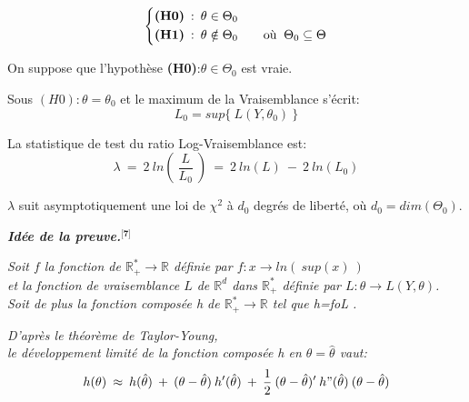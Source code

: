 \documentclass[11pt,fleqn]{book} %
\begin{document}
	
	\vspace{1em}
	
	\begin{equation*}
		\left\{\begin{aligned} & \textbf{(H0)} \: : \: \theta\in\Theta_0 \\
			& \textbf{(H1)} \: : \: \theta \notin \Theta_0 
			\qquad \textnormal{où }\: \Theta_0 \subseteq \Theta \end{aligned}\right. 
	\end{equation*}
	
	\vspace{2em} 
	
	On suppose que l'hypothèse \textbf{(H0)}\::\:$\theta\in\Theta_0$ est vraie.
	
	\vspace{1em}
	
	Sous $(H0): \theta=\theta_0$ et le maximum de la Vraisemblance s'écrit:
	\[
	L_0=sup\{\:L(Y,\theta_0)\:\} 
	\]
	
	\vspace{2em}
	
	La statistique de test du ratio Log-Vraisemblance est:
	\[
	\lambda\:=\:2\:ln\left(\:
	\frac{L}{L_0}
	\:\right) \:=\: 2\:ln(L)\:-\: 2\:ln(L_0)
	\]
	
	\vspace{1em}
	
	$\lambda$ suit asymptotiquement une loi de $\chi^2$ à $d_0$ degrés de liberté, où $d_0=dim(\Theta_0)$.
	
	\vspace{0.5em}
	
	\textbf{\textit{Idée de la preuve.$^\textbf{[7]}$}}
	
	\vspace{0.5em}
	
	\textit{
		Soit $f$ la fonction de $\mathbb{R}_{+}^{*}\rightarrow\mathbb{R}$ définie par $f:x\rightarrow ln(\:sup(x)\:)$\\ et la fonction de vraisemblance $L$ de $\mathbb{R}^{d}$ dans $\mathbb{R}_{+}^{*}$ définie par $L:\theta \rightarrow L(Y,\theta)$.\\ 
		Soit de plus la fonction composée h de $\mathbb{R}_{+}^{*}\rightarrow\mathbb{R}$ tel que h\:=\:f\:o\:L .}
	
	\vspace{1em}
	
	\textit{D'après le théorème de Taylor-Young,\\ 
		le développement limité de la fonction composée h en $\theta=\hat{\theta}$ vaut:}\\
	\[ 
	h(\theta)\:\approx\:h(\hat{\theta})\:+\:(\theta-\hat{\theta})\:h'(\hat{\theta})\:+\: \frac{1}{2} \:(\theta-\hat{\theta})'\:h"(\hat{\theta})\:(\theta-\hat{\theta})
	\]
	
\end{document}
